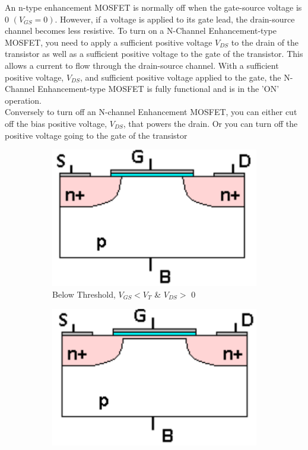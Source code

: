 \begin{enumerate}
An n-type enhancement MOSFET is normally off when the gate-source voltage is 0 $(V_{GS}=0)$. However, if a voltage is applied to its gate lead, the drain-source channel becomes less resistive. To turn on a N-Channel Enhancement-type MOSFET, you need to apply a sufficient positive voltage $V_{DS}$ to the drain of the transistor as well as a sufficient positive voltage to the gate of the transistor. This allows a current to flow through the drain-source channel. With a sufficient positive voltage, $V_{DS}$, and sufficient positive voltage applied to the gate, the N-Channel Enhancement-type MOSFET is fully functional and is in the 'ON' operation. \\
Conversely to turn off an N-channel Enhancement MOSFET, you can either cut off the bias positive voltage, $V_{DS}$, that powers the drain. Or you can turn off the positive voltage going to the gate of the transistor
\begin{figure}[ht] 
  \begin{subfigure}[b]{0.40\linewidth}
    \centering
    \includegraphics[width=0.90\linewidth]{figures/prelab_no_flow.png} 
    \caption{Below Threshold, $V_{GS} < V_T$ \& $V_{DS}>$ 0}
    \label{fig:no_flow} 
    \vspace{4ex}
  \end{subfigure}
  \begin{subfigure}[b]{0.40\linewidth}
    \centering
    \includegraphics[width=0.90\linewidth]{figures/prelabb_channel.png} 

\end{subfigure}
\end{figure}
\end{enumerate}
